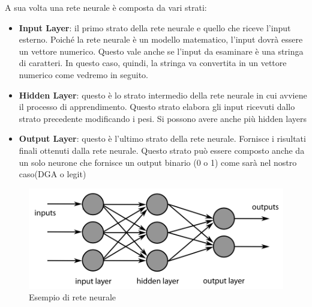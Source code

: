 \documentclass[12pt,a4paper,openright,twoside]{book}
\begin{document}
A sua volta una rete neurale è composta da vari strati:
\begin{itemize}
    \item \textbf{Input Layer}: il primo strato della rete neurale
    e quello che riceve l'input esterno. Poiché la rete neurale
    è un modello matematico, l'input dovrà essere
    un vettore numerico. Questo vale anche se l'input da esaminare
    è una stringa di caratteri. In questo caso, quindi, la stringa va convertita in un vettore numerico
    come vedremo in seguito.
    \item \textbf{Hidden Layer}: questo è lo strato intermedio della rete neurale in cui avviene
    il processo di apprendimento.
    Questo strato elabora gli input ricevuti dallo strato precedente
    modificando i pesi. Si possono avere anche più hidden layers
    \item \textbf{Output Layer}: questo è l'ultimo strato della rete neurale.
    Fornisce i risultati finali ottenuti dalla rete neurale. Questo strato
    può essere composto anche da un solo neurone che fornisce
    un output binario (0 o 1) come sarà nel nostro caso(DGA o legit)
\end{itemize}

\begin{figure}[H]
    \centering
    \includegraphics[width=.8\linewidth]{figures/MultiLayerNeuralNetwork.png}
    \caption{Esempio di rete neurale \cite{wiki:001}}
    \label{fig:ANN}
\end{figure}
\end{document}
